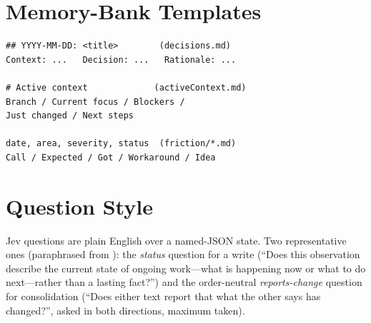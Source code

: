 \section{Memory-Bank Templates}
\begin{verbatim}
## YYYY-MM-DD: <title>        (decisions.md)
Context: ...   Decision: ...   Rationale: ...

# Active context             (activeContext.md)
Branch / Current focus / Blockers /
Just changed / Next steps

date, area, severity, status  (friction/*.md)
Call / Expected / Got / Workaround / Idea
\end{verbatim}

\section{Question Style}
Jev questions are plain English over a named-JSON state. Two representative ones (paraphrased from ): the \emph{status} question for a write (``Does this observation describe the current state of ongoing work---what is happening now or what to do next---rather than a lasting fact?'') and the order-neutral \emph{reports-change} question for consolidation (``Does either text report that what the other says has changed?'', asked in both directions, maximum taken).
